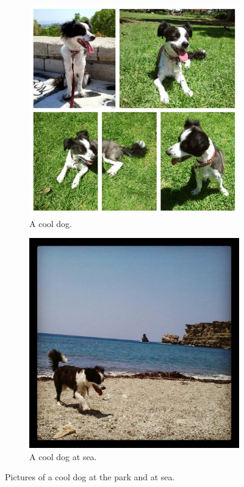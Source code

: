 \documentclass{llncs}
\begin{document}
\begin{figure}[t]
    \centering
    \begin{subfigure}[c]{.45\textwidth}
        \includegraphics[width=\textwidth]{figs/lucy1}
        \caption[A cool dog.]{A cool dog.}
        \label{fig:lucy1}
    \end{subfigure}
    \hfill
    \begin{subfigure}[c]{.45\textwidth}
        \centering
        \includegraphics[width=\textwidth]{figs/lucy2}
        \caption[A cool dog at sea.]{A cool dog at sea.}
        \label{fig:lucy2}
   \end{subfigure}
    \caption[Dog Pictures]{
        Pictures of a cool dog at the park and at sea.
    }
    \label{fig:dogs}
\end{figure}
\end{document}
